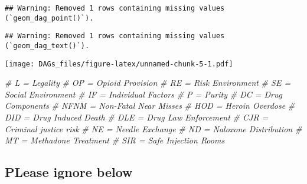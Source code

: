 \documentclass[
]{article}
\newenvironment{Shaded}{\begin{snugshade}}{\end{snugshade}}
\newcommand{\CommentTok}[1]{\textcolor[rgb]{0.56,0.35,0.01}{\textit{#1}}}
\begin{document}
\begin{verbatim}
## Warning: Removed 1 rows containing missing values (`geom_dag_point()`).
\end{verbatim}

\begin{verbatim}
## Warning: Removed 1 rows containing missing values (`geom_dag_text()`).
\end{verbatim}

\texttt{[image: DAGs\_files/figure-latex/unnamed-chunk-5-1.pdf]}

\begin{Shaded}
\begin{Highlighting}[]
\CommentTok{\# L = Legality}
\CommentTok{\# OP = Opioid Provision}
\CommentTok{\# RE = Risk Environment}
\CommentTok{\# SE = Social Environment}
\CommentTok{\# IF = Individual Factors}
\CommentTok{\# P = Purity}
\CommentTok{\# DC = Drug Components}
\CommentTok{\# NFNM = Non{-}Fatal Near Misses}
\CommentTok{\# HOD = Heroin Overdose}
\CommentTok{\# DID = Drug Induced Death }
\CommentTok{\# DLE = Drug Law Enforcement }
\CommentTok{\# CJR = Criminal justice risk}
\CommentTok{\# NE = Needle Exchange}
\CommentTok{\# ND = Naloxone Distribution}
\CommentTok{\# MT = Methadone Treatment }
\CommentTok{\# SIR = Safe Injection Rooms}
\end{Highlighting}
\end{Shaded}

\hypertarget{please-ignore-below}{%
\subsection{PLease ignore below}\label{please-ignore-below}}
\end{document}
